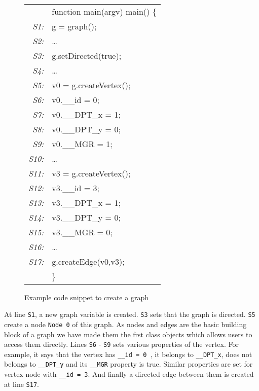 \begin{example}
{\begin{figure}
\begin{center}
      {\small \tt
        \begin{tabular}[b]{rl}
          &function main(argv) main() \{ \\
          {\em \scriptsize S1:}& \quad g = graph(); \\
          {\em \scriptsize S2:}& \quad \ldots        \\
          {\em \scriptsize S3:}& \quad g.setDirected(true); \\
          {\em \scriptsize S4:}& \quad \ldots \\ {\em \scriptsize S5:}& \quad v0  
          = g.createVertex(); \\
          {\em \scriptsize S6:}& \quad v0.\_\_id     = 0; \\
          {\em \scriptsize S7:}& \quad v0.\_\_DPT\_x  = 1; \\
          {\em \scriptsize S8:}& \quad v0.\_\_DPT\_y  = 0; \\
          {\em \scriptsize S9:}& \quad v0.\_\_MGR    = 1; \\
          {\em \scriptsize S10:}& \quad \ldots \\ {\em \scriptsize S11:}& \quad 
          v3  = g.createVertex(); \\
          {\em \scriptsize S12:}& \quad v3.\_\_id     = 3; \\
          {\em \scriptsize S13:}& \quad v3.\_\_DPT\_x  = 1; \\
          {\em \scriptsize S14:}& \quad v3.\_\_DPT\_y  = 0; \\
          {\em \scriptsize S15:}& \quad v3.\_\_MGR    = 0; \\
          {\em \scriptsize S16:}& \quad \ldots \\ {\em \scriptsize S17:}& \quad 
          g.createEdge(v0,v3); \\
          &\}
        \end{tabular}
      }
\end{center}
  \caption{Example code snippet to create a graph}
  \label{fig:motiv_2}
\end{figure}
  
  
  
  At line {\tt S1}, a new graph variable is created. {\tt S3} sets that
  the graph is directed. {\tt S5} create a node {\tt Node 0} of this graph. As 
  nodes and edges are the basic building block of a graph we have made them the 
  frst class objects which allows users to access them directly. Lines {\tt S6} 
  - {\tt S9} sets various properties of the vertex. For example, it says that 
    the vertex has {\tt \_\_id = 0 }, it belongs to  {\tt \_\_DPT\_x}, does not 
    belongs to {\tt \_\_DPT\_y} and its {\tt \_\_MGR} property is true. Similar 
    properties are set for vertex node with {\tt \_\_id = 3}.
  And finally a directed  edge between them is created at line {\tt S17}. 

}
\end{example}
